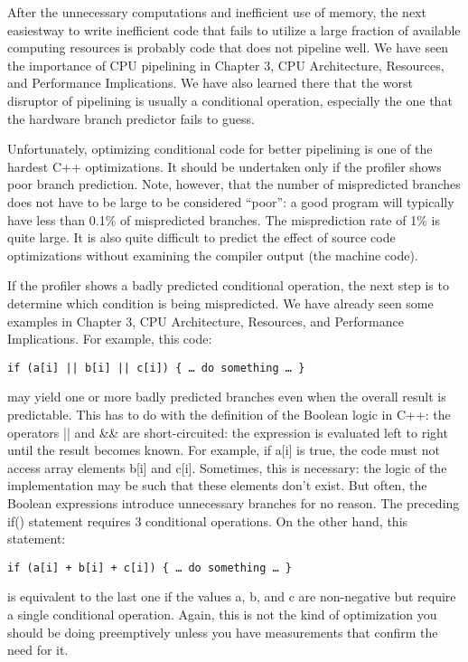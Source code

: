 After the unnecessary computations and inefficient use of memory, the next easiestway to write inefficient code that fails to utilize a large fraction of available computing resources is probably code that does not pipeline well. We have seen the importance of CPU pipelining in Chapter 3, CPU Architecture, Resources, and Performance Implications. We have also learned there that the worst disruptor of pipelining is usually a conditional operation, especially the one that the hardware branch predictor fails to guess. 

Unfortunately, optimizing conditional code for better pipelining is one of the hardest C++ optimizations. It should be undertaken only if the profiler shows poor branch prediction. Note, however, that the number of mispredicted branches does not have to be large to be considered “poor”: a good program will typically have less than 0.1\% of mispredicted branches. The misprediction rate of 1\% is quite large. It is also quite difficult to predict the effect of source code optimizations without examining the compiler output (the machine code).

If the profiler shows a badly predicted conditional operation, the next step is to determine which condition is being mispredicted. We have already seen some examples in Chapter 3, CPU Architecture, Resources, and Performance Implications. For example, this code:

\begin{lstlisting}[style=styleCXX]
if (a[i] || b[i] || c[i]) { … do something … }
\end{lstlisting}

may yield one or more badly predicted branches even when the overall result is predictable. This has to do with the definition of the Boolean logic in C++: the operators || and \&\& are short-circuited: the expression is evaluated left to right until the result becomes known. For example, if a[i] is true, the code must not access array elements b[i] and c[i]. Sometimes, this is necessary: the logic of the implementation may be such that these elements don’t exist. But often, the Boolean expressions introduce unnecessary branches for no reason. The preceding if() statement requires 3 conditional operations. On the other hand, this statement:

\begin{lstlisting}[style=styleCXX]
if (a[i] + b[i] + c[i]) { … do something … }
\end{lstlisting}

is equivalent to the last one if the values a, b, and c are non-negative but require a single conditional operation. Again, this is not the kind of optimization you should be doing preemptively unless you have measurements that confirm the need for it.

